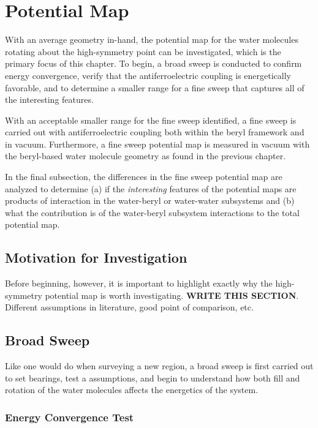 \chapter{Potential Map}
\label{ch:pot_map}

With an average geometry in-hand, the potential map for the water molecules rotating about the high-symmetry point can be investigated, which is the primary focus of this chapter. To begin, a broad sweep is conducted to confirm energy convergence, verify that the antiferroelectric coupling is energetically favorable, and to determine a smaller range for a fine sweep that captures all of the interesting features. 

With an acceptable smaller range for the fine sweep identified, a fine sweep is carried out with antiferroelectric coupling both within the beryl framework and in vacuum. Furthermore, a fine sweep potential map is measured in vacuum with the beryl-based water molecule geometry as found in the previous chapter. 

In the final subsection, the differences in the fine sweep potential map are analyzed to determine (a) if the \textit{interesting} features of the potential maps are products of interaction in the water-beryl or water-water subsystems and (b) what the contribution is of the water-beryl subsystem interactions to the total potential map.

    \section{Motivation for Investigation}
    Before beginning, however, it is important to highlight exactly why the high-symmetry potential map is worth investigating.
    \textbf{WRITE THIS SECTION}. Different assumptions in literature, good point of comparison, etc.

    \section{Broad Sweep}
    Like one would do when surveying a new region, a broad sweep is first carried out to set bearings, test a assumptions, and begin to understand how both fill and rotation of the water molecules affects the energetics of the system. 
        \subsection{Energy Convergence Test}
        \label{sec:en_conv_test}
